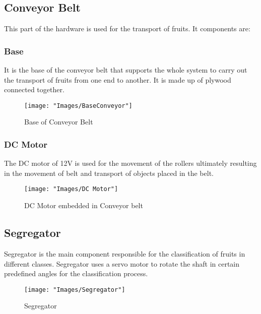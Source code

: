\subsection{Conveyor Belt}
This part of the hardware is used for the transport of fruits. It components are:

\subsubsection{Base}
It is the base of the conveyor belt that supports the whole system to carry out the transport of fruits from one end to another. It is made up of plywood connected together.

\begin{figure}[H]   \centering
	\texttt{[image: "Images/BaseConveyor"]}
	\caption{Base of Conveyor Belt}
	\label{fig:Base of Conveyor Belt}
\end{figure}

\subsubsection{DC Motor}
The DC motor of 12V is used for the movement of the rollers ultimately resulting in the movement of belt and transport of objects placed in the belt.

\begin{figure}[H]   \centering
	\texttt{[image: "Images/DC Motor"]}
	\caption{DC Motor embedded in Conveyor belt}
	\label{fig:DC Motor embedded in Conveyor belt}
\end{figure}

\subsection{Segregator}
Segregator is the main component responsible for the classification of fruits in different classes. Segregator uses a servo motor to rotate the shaft in certain predefined angles for the classification process.

\begin{figure}[H]   \centering
	\texttt{[image: "Images/Segregator"]}
	\caption{Segregator}
	\label{fig:Segregator}
\end{figure}

\par 